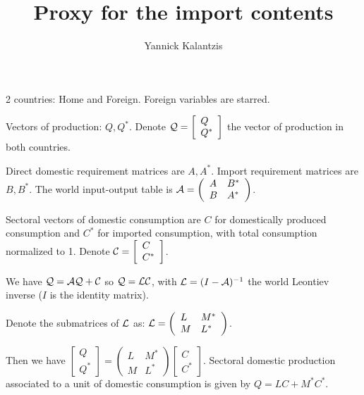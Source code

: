 \documentclass[A4]{article}
\title{Proxy for the import contents}
\author{Yannick Kalantzis}
\begin{document}
\maketitle 

2 countries: Home and Foreign. Foreign variables are starred.

Vectors of production: $Q, Q^*$.
Denote $\cal Q = \left[
  \begin{array}{l}
    Q \\ Q^*
  \end{array}
\right]$ the vector of production in both countries.

Direct domestic requirement matrices are $A, A^*$. Import requirement
matrices are $B, B^*$. The world input-output table is $\cal A = \left(
  \begin{array}{ll}
    A & B^* \\ B & A^*
  \end{array}
\right)$.

Sectoral vectors of domestic consumption are $C$ for
domestically produced consumption and $C^*$ for imported consumption,
with total consumption normalized to 1. Denote $\cal C = \left[
  \begin{array}{l}
    C \\ C^*
  \end{array}
\right]$.

We have $\cal Q = \cal A \cal Q + \cal C$ so $\cal Q = \cal L\cal C$,
with ${\cal L} = (I-{\cal A})^{-1}$ the world Leontiev inverse ($I$ is
the identity matrix).

Denote the submatrices of $\cal L$ as:
$\cal L = \left(
  \begin{array}{ll}
    L & M^* \\ M & L^*
  \end{array}
\right)$.

Then we have
$ \left[
  \begin{array}{l}
    Q \\ Q^*
  \end{array}
\right] = \left(
  \begin{array}{ll}
    L & M^* \\ M & L^*
  \end{array}
\right)\left[
  \begin{array}{l}
    C \\ C^*
  \end{array}
\right]$.
Sectoral domestic production associated to a unit of domestic consumption is given by $Q =
LC+M^*C^*$. 
\end{document}
